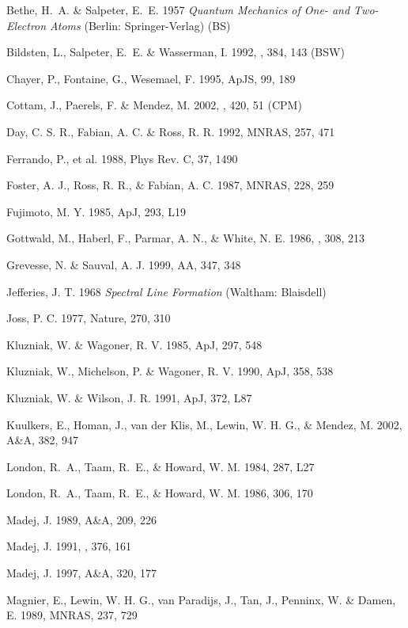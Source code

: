 \documentclass[iop,apjl,letterpaper]{emulateapj}
\begin{document}
\begin{references}

\noindent
Bethe, H.~A. \& Salpeter, E.~E. 1957 \textit{Quantum Mechanics of One-
  and Two-Electron Atoms} (Berlin: Springer-Verlag) (BS) 

\noindent
Bildsten, L., Salpeter, E.~E. \& Wasserman, I. 1992, \apj, 384, 143
(BSW) 

\noindent
Chayer, P., Fontaine, G., Wesemael, F. 1995, ApJS, 99, 189

\noindent
Cottam, J., Paerels, F. \& Mendez, M. 2002, \nat, 420, 51 (CPM) 

\noindent
Day, C. S. R., Fabian, A. C. \& Ross, R. R. 1992, MNRAS, 257, 471

\noindent 
Ferrando, P., et al. 1988, Phys Rev. C, 37, 1490 

\noindent
Foster, A. J., Ross, R. R., \& Fabian, A. C. 1987, MNRAS, 228, 259

\noindent
Fujimoto, M. Y. 1985, ApJ, 293, L19

\noindent
Gottwald, M., Haberl, F., Parmar, A. N., \& White, N. E. 1986, \apj,
308, 213 

\noindent
Grevesse, N. \& Sauval, A. J. 1999, AA, 347, 348 

\noindent
Jefferies, J. T. 1968 \textit{Spectral Line Formation} (Waltham:
Blaisdell)

\noindent 
Joss, P. C. 1977, Nature, 270, 310 

\noindent 
Kluzniak, W. \& Wagoner, R. V. 1985, ApJ, 297, 548  
 
\noindent 
Kluzniak, W., Michelson, P. \& Wagoner, R. V. 1990, ApJ, 358, 538

\noindent 
Kluzniak, W. \& Wilson, J. R. 1991, ApJ, 372, L87

\noindent
Kuulkers, E., Homan, J., van der Klis, M., Lewin, W. H. G., \& Mendez,
M. 2002, A\&A, 382, 947

\noindent
London, R.~A., Taam, R.~E., \& Howard, W. M. 1984, 287, L27

\noindent
London, R.~A., Taam, R.~E., \& Howard, W. M. 1986, 306, 170

\noindent
Madej, J. 1989, A\&A, 209, 226

\noindent 
Madej, J. 1991, \apj, 376, 161

\noindent 
Madej, J. 1997, A\&A, 320, 177 

\noindent
Magnier, E., Lewin, W. H. G., van Paradijs, J., Tan, J., Penninx, W. \& Damen, E. 1989, MNRAS, 237, 729


\end{references}
\end{document}
